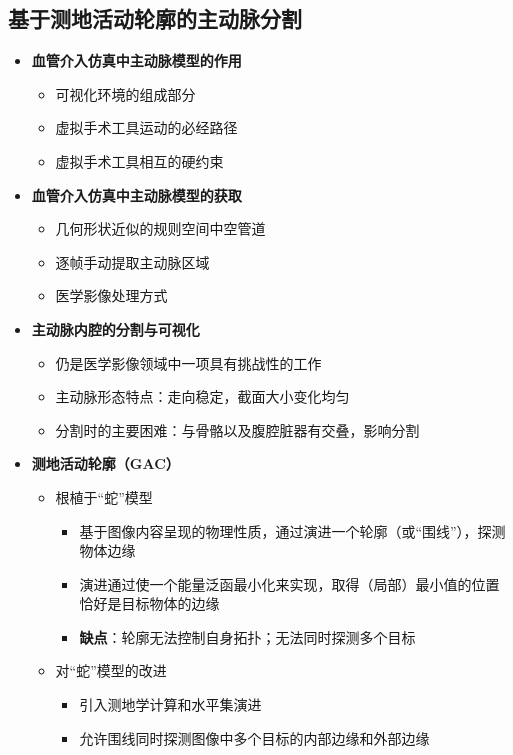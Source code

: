\subsection[主动脉分割]{基于测地活动轮廓的主动脉分割}

\begin{frame}
\begin{itemize}
\pause \item \textbf{血管介入仿真中主动脉模型的作用}
\begin{itemize}
\item 可视化环境的组成部分
\item 虚拟手术工具运动的必经路径
\item 虚拟手术工具相互的硬约束
\end{itemize}
\pause \item \textbf{血管介入仿真中主动脉模型的获取}
\begin{itemize}
\item 几何形状近似的规则空间中空管道
\item 逐帧手动提取主动脉区域
\item 医学影像处理方式
\end{itemize}
\pause \item \textbf{主动脉内腔的分割与可视化}
\begin{itemize}
\item 仍是医学影像领域中一项具有挑战性的工作
\item 主动脉形态特点：走向稳定，截面大小变化均匀
\item 分割时的主要困难：与骨骼以及腹腔脏器有交叠，影响分割
\end{itemize}
\end{itemize}
\end{frame} 

\begin{frame}
\begin{itemize}
\item \textbf{测地活动轮廓（GAC）}
\begin{itemize}
\item 根植于“蛇”模型
\begin{itemize}
\item 基于图像内容呈现的物理性质，通过演进一个轮廓（或“围线”），探测物体边缘
\item 演进通过使一个能量泛函最小化来实现，取得（局部）最小值的位置恰好是目标物体的边缘
\item \textbf{缺点}：轮廓无法控制自身拓扑；无法同时探测多个目标
\end{itemize}
\item 对“蛇”模型的改进
\begin{itemize}
\item 引入测地学计算和水平集演进
\item 允许围线同时探测图像中多个目标的内部边缘和外部边缘
\end{itemize}
\end{itemize}
\end{itemize}
\end{frame}

